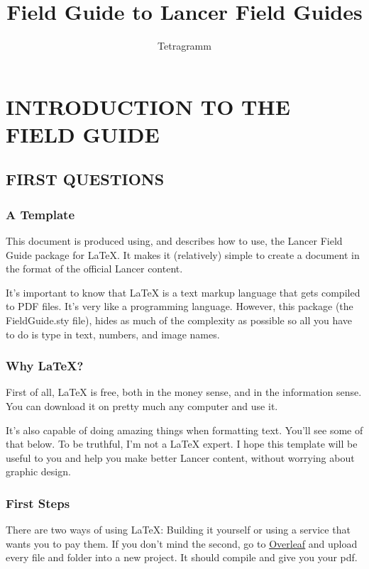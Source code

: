 \documentclass[twoside,headings,letterpaper,twocolumn]{article}
\title{Field Guide to Lancer Field Guides}
\author{Tetragramm}
\begin{document}
\frontmatter

\maketitle

\clearpage

\tableofcontents
\mainmatter
\section{INTRODUCTION TO THE FIELD GUIDE}
\subsection{FIRST QUESTIONS}
\subsubsection{A Template}
This document is produced using, and describes how to use, the Lancer Field Guide package for \LaTeX{}.  It makes it (relatively) simple to create a document in the format of the official Lancer content.

It's important to know that \LaTeX{} is a text markup language that gets compiled to PDF files.  It's very like a programming language.  However, this package (the FieldGuide.sty file), hides as much of the complexity as possible so all you have to do is type in text, numbers, and image names.

\subsubsection{Why LaTeX?}
First of all, \LaTeX{} is free, both in the money sense, and in the information sense.  You can download it on pretty much any computer and use it.

It's also capable of doing amazing things when formatting text.  You'll see some of that below.  To be truthful, I'm not a \LaTeX{}  expert.  I hope this template will be useful to you and help you make better Lancer content, without worrying about graphic design.

\subsubsection{First Steps}
There are two ways of using \LaTeX{}:  Building it yourself or using a service that wants you to pay them.  If you don't mind the second, go to \href{https://overleaf.com}{\color{blue}\underline{Overleaf}} and upload every file and folder into a new project.  It should compile and give you your pdf.
\end{document}
